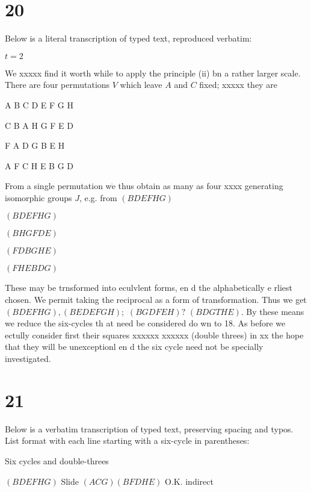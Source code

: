 \documentclass[12pt]{article}
\begin{document}
\section{20}

Below is a literal transcription of typed text, reproduced verbatim:

\bigskip

\noindent
\(t = 2\)

We xxxxx find it worth while to apply the principle (ii)
bn a rather larger scale. There are four permutations \(V\)
which leave \(A\) and \(C\) fixed; xxxxx they are

\bigskip

\noindent
A B C D E F G H

C B A H G F E D

F A D G B E H

A F C H E B G D

\bigskip

From a single permutation w\(\dot{\mathrm{e}}\) thus obtain as many as four
xxxx generating isomorphic groups \(J\), e.g. from \((BDEFHG)\)

\bigskip

\((BDEFHG)\)

\((BHGFDE)\)

\((FDBGHE)\)

\((FHEBDG)\)

\bigskip

These may be trnsformed into eculvlent forms, en d the
alphabetically e rliest chosen. We permit taking the reciprocal
as a form of transformation. Thus we get \((BDEFH G),(BEDEFGH);\)
\((BGDFEH)?\) \((BDGTHE)\). By these means we reduce the six-cycles
th at need be considered do wn to 18. As before we ectully
consider first their squares xxxxxx xxxxxx (double threes)
in xx the hope that they will be unexceptionl en d the
six cycle need not be specially investigated.

\section{21}

Below is a verbatim transcription of typed text, preserving spacing and typos.  
List format with each line starting with a six-cycle in parentheses:

\bigskip

\noindent
Six cycles and double-threes

\bigskip

\((BDEFHG)\) \quad Slide \((ACG)(BFDHE)\) O.K. indirect
\end{document}
